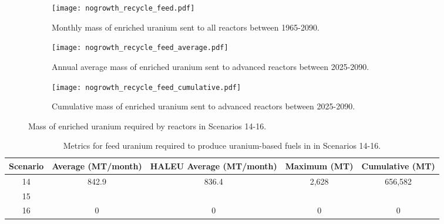 \begin{figure}[h!]
    \centering
    \begin{subfigure}[b]{0.45\textwidth}
        \centering
        \texttt{[image: nogrowth\_recycle\_feed.pdf]}
        \caption{Monthly mass of enriched uranium sent to all reactors 
        between 1965-2090.}
        \label{fig:nogrowth_recycle_all_feed}
    \end{subfigure}
    \hfill
    \begin{subfigure}[b]{0.45\textwidth}
        \centering
        \texttt{[image: nogrowth\_recycle\_feed\_average.pdf]}
        \caption{Annual average mass of enriched uranium sent to 
        advanced reactors between 2025-2090.}
        \label{fig:nogrowth_recycle_AR_feed}
    \end{subfigure}
    \begin{subfigure}[b]{0.45\textwidth}
        \centering
        \texttt{[image: nogrowth\_recycle\_feed\_cumulative.pdf]}
        \caption{Cumulative mass of enriched 
        uranium sent to advanced reactors between 2025-2090.}
        \label{fig:nogrowth_recycle_feed_cumulative}
    \end{subfigure}
       \caption{Mass of enriched uranium required by reactors
        in Scenarios 14-16.}
       \label{fig:nogrowth_recycle_feed}
\end{figure}

\begin{table}[h!]
    \centering 
    \caption{Metrics for feed uranium required to produce 
    uranium-based fuels in in Scenarios 14-16.}
    \label{tab:s14-16_feed}
    \begin{tabular}{c c c c c}
        \hline 
        Scenario & Average (MT/month) & HALEU Average (MT/month) &
        Maximum (MT) & Cumulative (MT) \\
        \hline 
        14 & 842.9 & 836.4 & 2,628 & 656,582 \\
        15 & & & & \\
        16 & 0 & 0 & 0 & 0\\
        \hline
        
    \end{tabular}
\end{table}



